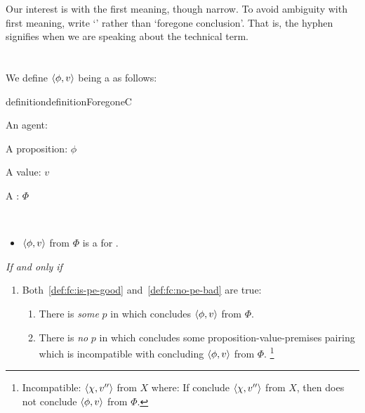 \begin{note}
  Our interest is with the first meaning, though narrow.
  To avoid ambiguity with first meaning, write `' rather than `foregone conclusion'.
  That is, the hyphen signifies when we are speaking about the technical term.
\end{note}

\section{}
\label{cha:sec:fcs-def}

\begin{note}[\fc{2} definition]
  We define \(\langle \phi, v \rangle\) being a \emph{} as follows:

  \begin{restatable}[\fc{3}]{definition}{definitionForegoneC}
    \label{def:fc}
    \begin{itemize*}[noitemsep, label=\(\circ\)]
    \item
      An agent: \vAgent{}
    \item
      A proposition: \(\phi\)
    \item
      A value: \(v\)
    \item
      A : \(\Phi\)
    \item
      \mbox{ }
    \end{itemize*}

    \begin{itemize}
    \item
      \(\langle \phi, v \rangle\) from \(\Phi\) is a \emph{} for \vAgent{}.
    \end{itemize}
    \emph{If and only if}
    \begin{enumerate}[label=]
    \item
      Both~\ref{def:fc:is-pe-good} and~\ref{def:fc:no-pe-bad} are true:
      \begin{enumerate}[label=\alph*., ref=(\alph*)]
      \item
        \label{def:fc:is-pe-good}
        There is \emph{some} \pevent{} \(p\) in which \vAgent{} concludes \(\langle \phi, v \rangle\) from \(\Phi\).
      \item
        \label{def:fc:no-pe-bad}
        There is \emph{no} \pevent{} \(p\) in which \vAgent{} concludes some proposition-value-premises pairing which is incompatible with concluding \(\langle \phi, v \rangle\) from \(\Phi\).%
        \footnote{
          Incompatible:
          \(\langle \chi, v'' \rangle\) from \(X\) where:
        If conclude \(\langle \chi, v'' \rangle\) from \(X\), then does not conclude \(\langle \phi, v \rangle\) from \(\Phi\).
        }
      \end{enumerate}
    \end{enumerate}
    \vspace{-\baselineskip}
  \end{restatable}
\end{note}

